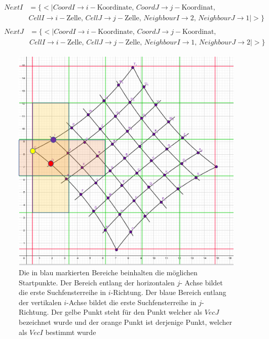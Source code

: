 \begin{gather*}
	\begin{split}
		NextI &= \{ <|CoordI \rightarrow i-\text{Koordinate},\, CoordJ \rightarrow j-\text{Koordinat},\, \\
		&CellI \rightarrow i-\text{Zelle},\, CellJ \rightarrow j-\text{Zelle},\,
		NeighbourI \rightarrow 2, \,NeighbourJ \rightarrow 1  |>\}
	\end{split}\\
	\begin{split}
	NextJ &= \{ <|CoordI \rightarrow i-\text{Koordinate},\, CoordJ \rightarrow j-\text{Koordinat},\, \\
	&CellI \rightarrow i-\text{Zelle},\, CellJ \rightarrow j-\text{Zelle},\,
	NeighbourI \rightarrow 1, \,NeighbourJ \rightarrow 2 |>\}
\end{split}
\end{gather*}

\begin{figure}[!htb]
	\centering
	\includegraphics[width=0.8\linewidth]{images/VerzeichnetesSchachbrett_2.png}
	\caption[Finden der Startvektoren in Schachbrettpunkten]{Die in blau markierten Bereiche beinhalten die möglichen Startpunkte. Der Bereich entlang der horizontalen $j$- Achse bildet die erste Suchfensterreihe in $i$-Richtung. Der blaue Bereich entlang der vertikalen $i$-Achse bildet die erste Suchfensterreihe in $j$-Richtung. Der gelbe Punkt steht für den Punkt welcher als $VecJ$ bezeichnet wurde und der orange Punkt ist derjenige Punkt, welcher als $VecI$ bestimmt wurde}
	\label{fig:NextINextJ}
\end{figure}

